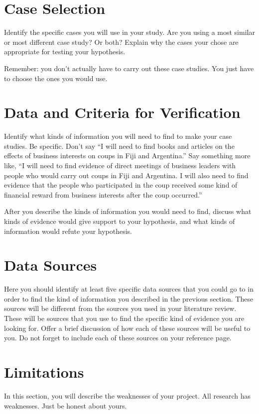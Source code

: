 \documentclass{turabian-researchpaper}
\begin{document}
\section{Case Selection}
Identify the specific cases you will use in your study. Are you using a most similar or most different case study? Or both? Explain why the cases your chose are appropriate for testing your hypothesis.

Remember: you don't actually have to carry out these case studies. You just have to choose the ones you would use.

\section{Data and Criteria for Verification}
Identify what kinds of information you will need to find to make your case studies. Be specific. Don't say ``I will need to find books and articles on the effects of business interests on coups in Fiji and Argentina.'' Say something more like, ``I will need to find evidence of direct meetings of business leaders with people who would carry out coups in Fiji and Argentina. I will also need to find evidence that the people who participated in the coup received some kind of financial reward from business interests after the coup occurred.''

After you describe the kinds of information you would need to find, discuss what kinds of evidence would give support to your hypothesis, and what kinds of information would refute your hypothesis.

\section{Data Sources}
Here you should identify at least five specific data sources that you could go to in order to find the kind of information you described in the previous section. These sources will be different from the sources you used in your literature review. These will be sources that you use to find the specific kind of evidence you are looking for. Offer a brief discussion of how each of these sources will be useful to you. Do not forget to include each of these sources on your reference page.

\section{Limitations}
In this section, you will describe the weaknesses of your project. All research has weaknesses. Just be honest about yours.
\end{document}
